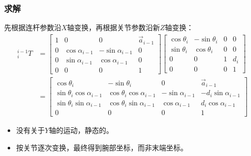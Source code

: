 \documentclass[
12pt, %
a4paper, 
oneside, %
headinclude,footinclude, %
]{scrartcl}
\begin{document}
\subsubsection[求解]{求解}
先根据连杆参数沿$ X $轴变换，再根据关节参数沿新$ Z $轴变换：
\begin{align*}
{}^{i - 1}_i T &= \begin{bmatrix} 1 & 0 & 0 & \vec{a}_{i - 1} \\ 0 & \cos\alpha_{i - 1} & -\sin\alpha_{i - 1} & 0 \\ 0 & \sin\alpha_{i - 1} & \cos\alpha_{i - 1} & 0 \\ 0 & 0 & 0 & 1 \end{bmatrix} \begin{bmatrix} \cos\theta_i & -\sin\theta_i & 0 & 0 \\ \sin\theta_i & \cos\theta_i & 0 & 0 \\ 0 & 0 & 1 & d_i \\ 0 & 0 & 0 & 1 \end{bmatrix} \\
&= \begin{bmatrix} \cos\theta_i & -\sin\theta_i & 0 & \vec{a}_{i - 1} \\ \sin\theta_i \cos\alpha_{i - 1} & \cos\theta_i \cos\alpha_{i - 1} & -\sin\alpha_{i - 1} & -d_i \sin\alpha_{i - 1} \\ \sin\theta_i \sin\alpha_{i - 1} & \cos\theta_i \sin\alpha_{i - 1} & \cos\alpha_{i - 1} & d_i \cos\alpha_{i - 1} \\ 0 & 0 & 0 & 1 \end{bmatrix}
\end{align*}

\begin{itemize}
\item 没有关于$ Y $轴的运动，静态的。
\item 按关节逐次变换，最终得到腕部坐标，而非末端坐标。
\end{itemize} 
\end{document}
